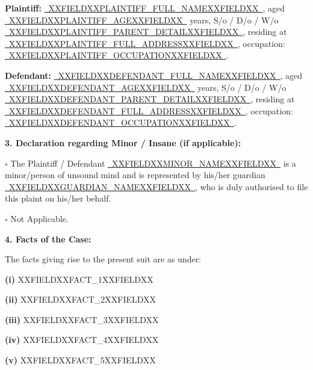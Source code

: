 \documentclass[12pt, a4paper]{article}
\newcommand{\fillline}[1]{\underline{~#1~}}
\begin{document}
\vspace{4pt}
\noindent \textbf{Plaintiff:} \fillline{XXFIELDXXPLAINTIFF_FULL_NAMEXXFIELDXX}, aged \fillline{XXFIELDXXPLAINTIFF_AGEXXFIELDXX} years, S/o / D/o / W/o \fillline{XXFIELDXXPLAINTIFF_PARENT_DETAILXXFIELDXX}, residing at \fillline{XXFIELDXXPLAINTIFF_FULL_ADDRESSXXFIELDXX}, \linebreak occupation: \fillline{XXFIELDXXPLAINTIFF_OCCUPATIONXXFIELDXX}.

\vspace{6pt}
\noindent \textbf{Defendant:} \fillline{XXFIELDXXDEFENDANT_FULL_NAMEXXFIELDXX}, aged \fillline{XXFIELDXXDEFENDANT_AGEXXFIELDXX} years, S/o / D/o / W/o \fillline{XXFIELDXXDEFENDANT_PARENT_DETAILXXFIELDXX}, residing at \fillline{XXFIELDXXDEFENDANT_FULL_ADDRESSXXFIELDXX}, \linebreak occupation: \fillline{XXFIELDXXDEFENDANT_OCCUPATIONXXFIELDXX}.

\vspace{8pt}
\noindent \textbf{3. Declaration regarding Minor / Insane (if applicable):}

\noindent $\square$ \; The Plaintiff / Defendant \fillline{XXFIELDXXMINOR_NAMEXXFIELDXX} is a minor/person of unsound mind and is represented by his/her guardian \fillline{XXFIELDXXGUARDIAN_NAMEXXFIELDXX}, who is duly authorised to file this plaint on his/her behalf.

\noindent $\square$ \; Not Applicable.

\vspace{8pt}
\noindent \textbf{4. Facts of the Case:}

\noindent The facts giving rise to the present suit are as under:

\vspace{4pt}
\noindent \textbf{(i)} XXFIELDXXFACT_1XXFIELDXX

\vspace{6pt}
\noindent \textbf{(ii)} XXFIELDXXFACT_2XXFIELDXX

\vspace{6pt}
\noindent \textbf{(iii)} XXFIELDXXFACT_3XXFIELDXX

\vspace{6pt}
\noindent \textbf{(iv)} XXFIELDXXFACT_4XXFIELDXX

\vspace{6pt}
\noindent \textbf{(v)} XXFIELDXXFACT_5XXFIELDXX
\end{document}

